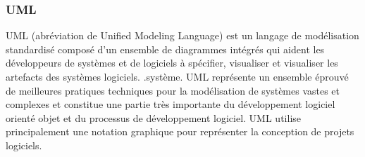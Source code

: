         \subsubsection{UML}
            UML (abréviation de Unified Modeling Language) est un langage de modélisation standardisé composé d'un ensemble de diagrammes intégrés qui aident les développeurs de systèmes et de logiciels à spécifier, visualiser et visualiser les artefacts des systèmes logiciels. .système. UML représente un ensemble éprouvé de meilleures pratiques techniques pour la modélisation de systèmes vastes et complexes et constitue une partie très importante du développement logiciel orienté objet et du processus de développement logiciel. UML utilise principalement une notation graphique pour représenter la conception de projets logiciels.

